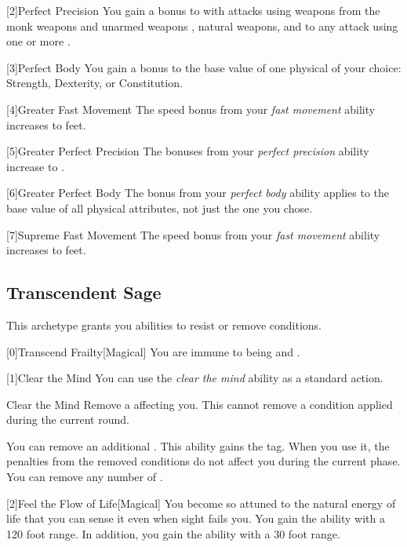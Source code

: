         [2]{Perfect Precision} You gain a  bonus to  with attacks using weapons from the monk weapons and unarmed weapons , natural weapons, and to any attack using one or more .

        [3]{Perfect Body} You gain a  bonus to the base value of one physical  of your choice: Strength, Dexterity, or Constitution.

        [4]{Greater Fast Movement} The speed bonus from your \textit{fast movement} ability increases to  feet.

        [5]{Greater Perfect Precision} The bonuses from your \textit{perfect precision} ability increase to .

        [6]{Greater Perfect Body} The bonus from your \textit{perfect body} ability applies to the base value of all physical attributes, not just the one you chose.

        [7]{Supreme Fast Movement} The speed bonus from your \textit{fast movement} ability increases to  feet.

    \newpage
    \subsection{Transcendent Sage}
        This archetype grants you abilities to resist or remove conditions.

        [0]{Transcend Frailty}[Magical]
        You are immune to being  and .

        [1]{Clear the Mind} You can use the \textit{clear the mind} ability as a standard action.
        \begin{freeability}{Clear the Mind}
            Remove a  affecting you.
            This cannot remove a condition applied during the current round.

            \rankline
             You can remove an additional .
             This ability gains the  tag.
            When you use it, the penalties from the removed conditions do not affect you during the current phase.
             You can remove any number of .
        \end{freeability}

        [2]{Feel the Flow of Life}[Magical] You become so attuned to the natural energy of life that you can sense it even when sight fails you.
        You gain the  ability with a 120 foot range.
        In addition, you gain the  ability with a 30 foot range.

